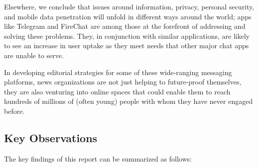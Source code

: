 \documentclass[notoc, symmetric, nobib, nols]{towcenter-guideto-book}
\begin{document}
Elsewhere, we conclude that issues around information, privacy, personal security, and mobile data penetration will unfold in different ways around the world; apps like Telegram and FireChat are among those at the forefront of addressing and solving these problems. They, in conjunction with similar applications, are likely to see an increase in user uptake as they meet needs that other major chat apps are unable to serve.

In developing editorial strategies for some of these wide-ranging messaging platforms, news organizations are not just helping to future-proof themselves, they are also venturing into online spaces that could enable them to reach hundreds of millions of (often young) people with whom they have never engaged before.

\subsection{Key Observations}

The key findings of this report can be summarized as follows:
\end{document}
